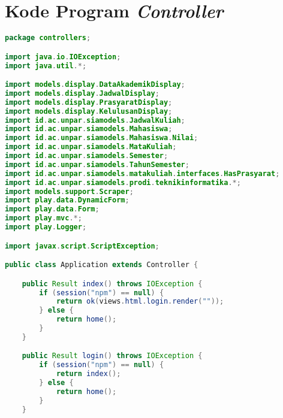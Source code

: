 \chapter{Kode Program \textit{Controller}}
\label{lamp:A}

\singlespacing
\begin{lstlisting}[language=Java,basicstyle=\tiny,caption=Applicstion.java]
package controllers;

import java.io.IOException;
import java.util.*;

import models.display.DataAkademikDisplay;
import models.display.JadwalDisplay;
import models.display.PrasyaratDisplay;
import models.display.KelulusanDisplay;
import id.ac.unpar.siamodels.JadwalKuliah;
import id.ac.unpar.siamodels.Mahasiswa;
import id.ac.unpar.siamodels.Mahasiswa.Nilai;
import id.ac.unpar.siamodels.MataKuliah;
import id.ac.unpar.siamodels.Semester;
import id.ac.unpar.siamodels.TahunSemester;
import id.ac.unpar.siamodels.matakuliah.interfaces.HasPrasyarat;
import id.ac.unpar.siamodels.prodi.teknikinformatika.*;
import models.support.Scraper;
import play.data.DynamicForm;
import play.data.Form;
import play.mvc.*;
import play.Logger;

import javax.script.ScriptException;

public class Application extends Controller {

	public Result index() throws IOException {
		if (session("npm") == null) {
			return ok(views.html.login.render(""));
		} else {
			return home();
		}
	}

	public Result login() throws IOException {
		if (session("npm") == null) {
			return index();
		} else {
			return home();
		}
	}


\end{lstlisting}
